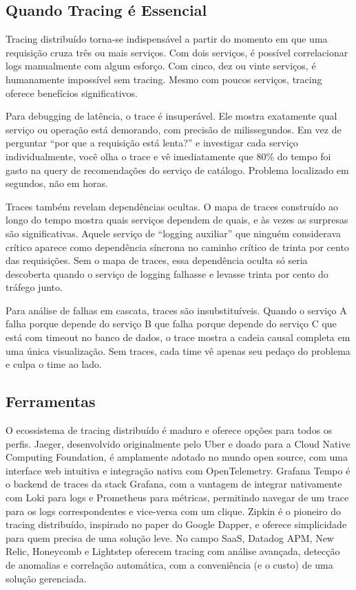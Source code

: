 \subsection{Quando Tracing é Essencial}

Tracing distribuído torna-se indispensável a partir do momento em que uma
requisição cruza três ou mais serviços. Com dois serviços, é possível
correlacionar logs manualmente com algum esforço. Com cinco, dez ou vinte
serviços, é humanamente impossível sem tracing. Mesmo com poucos serviços,
tracing oferece benefícios significativos.

Para debugging de latência, o trace é insuperável. Ele mostra exatamente qual
serviço ou operação está demorando, com precisão de milissegundos. Em vez de
perguntar ``por que a requisição está lenta?'' e investigar cada serviço
individualmente, você olha o trace e vê imediatamente que 80\% do tempo foi
gasto na query de recomendações do serviço de catálogo. Problema localizado
em segundos, não em horas.

Traces também revelam dependências ocultas. O mapa de traces construído ao longo
do tempo mostra quais serviços dependem de quais, e às vezes as surpresas são
significativas. Aquele serviço de ``logging auxiliar'' que ninguém considerava
crítico aparece como dependência síncrona no caminho crítico de trinta por cento
das requisições. Sem o mapa de traces, essa dependência oculta só seria
descoberta quando o serviço de logging falhasse e levasse trinta por cento do
tráfego junto.

Para análise de falhas em cascata, traces são insubstituíveis. Quando o
serviço A falha porque depende do serviço B que falha porque depende do serviço
C que está com timeout no banco de dados, o trace mostra a cadeia causal completa
em uma única visualização. Sem traces, cada time vê apenas seu pedaço do
problema e culpa o time ao lado.

\subsection{Ferramentas}

O ecossistema de tracing distribuído é maduro e oferece opções para todos os
perfis. Jaeger, desenvolvido originalmente pelo Uber e doado para a Cloud Native
Computing Foundation, é amplamente adotado no mundo open source, com uma interface
web intuitiva e integração nativa com OpenTelemetry. Grafana Tempo é o backend
de traces da stack Grafana, com a vantagem de integrar nativamente com Loki para
logs e Prometheus para métricas, permitindo navegar de um trace para os logs
correspondentes e vice-versa com um clique. Zipkin é o pioneiro do tracing
distribuído, inspirado no paper do Google Dapper, e oferece simplicidade para
quem precisa de uma solução leve. No campo SaaS, Datadog APM, New Relic,
Honeycomb e Lightstep oferecem tracing com análise avançada, detecção de
anomalias e correlação automática, com a conveniência (e o custo) de uma
solução gerenciada.


